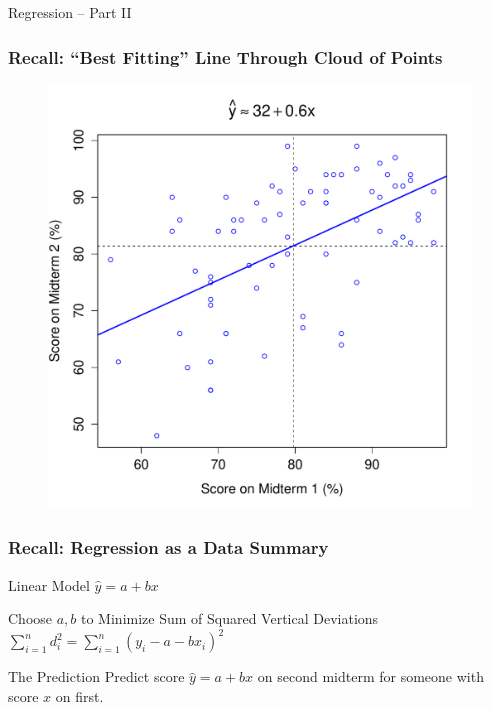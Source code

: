 
\begin{frame}
\begin{center}
	\huge Regression -- Part II
\end{center}
\end{frame}
\begin{frame}
\frametitle{Recall: ``Best Fitting'' Line Through Cloud of Points}
\begin{figure}
	\includegraphics[scale = 0.48]{./images/midterms5}
\end{figure}
\end{frame}
\begin{frame}
\frametitle{Recall: Regression as a Data Summary}
\begin{block}{Linear Model}
$\hat{y} = a + b x$
\end{block}
\begin{block}{Choose $a,b$ to Minimize Sum of Squared Vertical Deviations}
$\displaystyle\sum_{i = 1}^n d_i^2 = \sum_{i=1}^n (y_i - a - b x_i)^2$
\end{block}

\begin{block}{The Prediction}
Predict score $\hat{y} = a + b x$ on second midterm for someone with score $x$ on first.
\end{block}

\end{frame}
